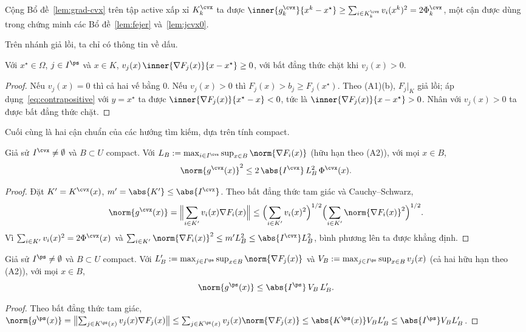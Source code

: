 \begin{remark}\label{rem:grad-cvx-sum}
Cộng Bổ đề~\ref{lem:grad-cvx} trên tập active xấp xỉ $K^{\cvx}_k$ ta được
$\inner{g^{\cvx}_k}{x^k-x^\star}\ge\sum_{i\in K^{\cvx}_k}v_i(x^k)^2=2\Phi^{\cvx}_k$, một cận
được dùng trong chứng minh các Bổ đề~\ref{lem:fejer} và~\ref{lem:jcvx0}.
\end{remark}

Trên nhánh giả lồi, ta chỉ có thông tin về dấu.

\begin{lemma}\label{lem:sign-ps}
Với $x^\star\in\Omega$, $j\in I^{\ps}$ và $x\in K$,
$v_j(x)\,\inner{\nabla F_j(x)}{x-x^\star}\ge 0$, với bất đẳng thức chặt khi $v_j(x)>0$.
\end{lemma}
\begin{proof}
Nếu $v_j(x)=0$ thì cả hai vế bằng $0$. Nếu $v_j(x)>0$ thì $F_j(x)>b_j\ge F_j(x^\star)$. Theo
(A1)(b), $F_j|_K$ giả lồi; áp dụng~\eqref{eq:contrapositive}
với $y=x^\star$ ta được $\inner{\nabla F_j(x)}{x^\star-x}<0$, tức là
$\inner{\nabla F_j(x)}{x-x^\star}>0$. Nhân với $v_j(x)>0$ ta được bất đẳng thức
chặt.
\end{proof}

Cuối cùng là hai cận chuẩn của các hướng tìm kiếm, dựa trên tính compact.

\begin{lemma}\label{lem:bound-cvx}
Giả sử $I^{\cvx}\ne\emptyset$ và $B\subset U$ compact. Với
$L_B:=\max_{i\in I^{\cvx}}\sup_{x\in B}\norm{\nabla F_i(x)}$ (hữu hạn theo (A2)), với mọi
$x\in B$,
\[
\norm{g^{\cvx}(x)}^2\le 2\,\abs{I^{\cvx}}\,L_B^2\,\Phi^{\cvx}(x).
\]
\end{lemma}
\begin{proof}
Đặt $K'=K^{\cvx}(x)$, $m'=\abs{K'}\le\abs{I^{\cvx}}$. Theo bất đẳng thức tam giác và
Cauchy--Schwarz,
\[
\norm{g^{\cvx}(x)}=\Bigl\|\sum_{i\in K'}v_i(x)\nabla F_i(x)\Bigr\|
\le\Bigl(\sum_{i\in K'}v_i(x)^2\Bigr)^{1/2}\Bigl(\sum_{i\in K'}\norm{\nabla F_i(x)}^2\Bigr)^{1/2}.
\]
Vì $\sum_{i\in K'}v_i(x)^2=2\Phi^{\cvx}(x)$ và
$\sum_{i\in K'}\norm{\nabla F_i(x)}^2\le m'L_B^2\le\abs{I^{\cvx}}L_B^2$, bình phương lên ta được
khẳng định.
\end{proof}

\begin{lemma}\label{lem:bound-ps}
Giả sử $I^{\ps}\ne\emptyset$ và $B\subset U$ compact. Với
$L'_B:=\max_{j\in I^{\ps}}\sup_{x\in B}\norm{\nabla F_j(x)}$ và
$V_B:=\max_{j\in I^{\ps}}\sup_{x\in B}v_j(x)$ (cả hai hữu hạn theo (A2)), với mọi $x\in B$,
\[
\norm{g^{\ps}(x)}\le\abs{I^{\ps}}\,V_B\,L'_B .
\]
\end{lemma}
\begin{proof}
Theo bất đẳng thức tam giác,
$\norm{g^{\ps}(x)}=\bigl\|\sum_{j\in K^{\ps}(x)}v_j(x)\nabla F_j(x)\bigr\|
\le\sum_{j\in K^{\ps}(x)}v_j(x)\norm{\nabla F_j(x)}\le\abs{K^{\ps}(x)}V_BL'_B
\le\abs{I^{\ps}}V_BL'_B$.
\end{proof}

